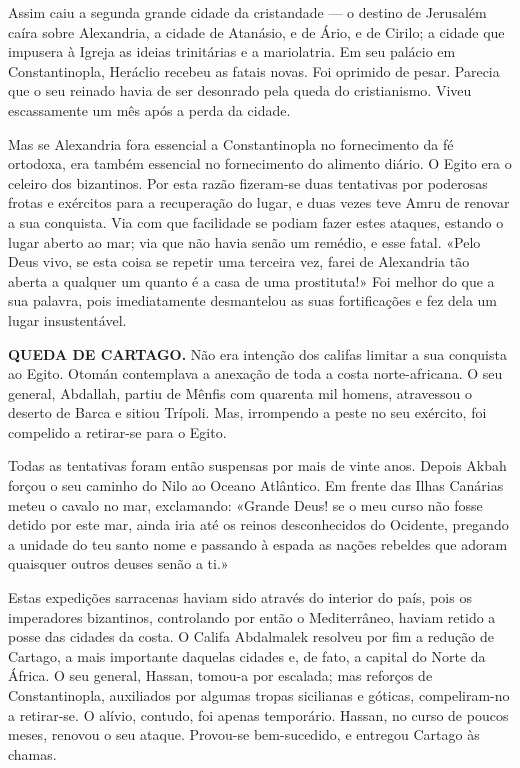 \documentclass[11pt,a5paper,twoside,openany]{book}
\begin{document}
Assim caiu a segunda grande cidade da cristandade — o destino de Jerusalém caíra sobre Alexandria, a cidade de Atanásio, e de Ário, e de Cirilo; a cidade que impusera à Igreja as ideias trinitárias e a mariolatria. Em seu palácio em Constantinopla, Heráclio recebeu as fatais novas. Foi oprimido de pesar. Parecia que o seu reinado havia de ser desonrado pela queda do cristianismo. Viveu escassamente um mês após a perda da cidade.

Mas se Alexandria fora essencial a Constantinopla no fornecimento da fé ortodoxa, era também essencial no fornecimento do alimento diário. O Egito era o celeiro dos bizantinos. Por esta razão fizeram-se duas tentativas por poderosas frotas e exércitos para a recuperação do lugar, e duas vezes teve Amru de renovar a sua conquista. Via com que facilidade se podiam fazer estes ataques, estando o lugar aberto ao mar; via que não havia senão um remédio, e esse fatal. «Pelo Deus vivo, se esta coisa se repetir uma terceira vez, farei de Alexandria tão aberta a qualquer um quanto é a casa de uma prostituta!» Foi melhor do que a sua palavra, pois imediatamente desmantelou as suas fortificações e fez dela um lugar insustentável.

\textbf{QUEDA DE CARTAGO.} Não era intenção dos califas limitar a sua conquista ao Egito. Otomán contemplava a anexação de toda a costa norte-africana. O seu general, Abdallah, partiu de Mênfis com quarenta mil homens, atravessou o deserto de Barca e sitiou Trípoli. Mas, irrompendo a peste no seu exército, foi compelido a retirar-se para o Egito.

Todas as tentativas foram então suspensas por mais de vinte anos. Depois Akbah forçou o seu caminho do Nilo ao Oceano Atlântico. Em frente das Ilhas Canárias meteu o cavalo no mar, exclamando: «Grande Deus! se o meu curso não fosse detido por este mar, ainda iria até os reinos desconhecidos do Ocidente, pregando a unidade do teu santo nome e passando à espada as nações rebeldes que adoram quaisquer outros deuses senão a ti.»

Estas expedições sarracenas haviam sido através do interior do país, pois os imperadores bizantinos, controlando por então o Mediterrâneo, haviam retido a posse das cidades da costa. O Califa Abdalmalek resolveu por fim a redução de Cartago, a mais importante daquelas cidades e, de fato, a capital do Norte da África. O seu general, Hassan, tomou-a por escalada; mas reforços de Constantinopla, auxiliados por algumas tropas sicilianas e góticas, compeliram-no a retirar-se. O alívio, contudo, foi apenas temporário. Hassan, no curso de poucos meses, renovou o seu ataque. Provou-se bem-sucedido, e entregou Cartago às chamas.
\end{document}
